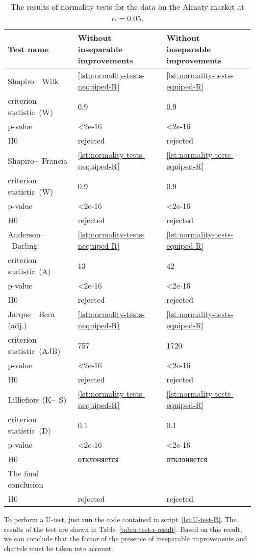 \documentclass[]{scrreprt}
\begin{document}
\begin{table}[htp]
	\caption{The results of normality tests for the data on the Almaty market at $\alpha=0.05$.}\label{tab:normality-tests-values-R}
	\centering
	\begin{tabular}{lll}
		\hline
		Test name&Without inseparable improvements&Without inseparable improvements\\
		\hline
		Shapiro--~Wilk&\ref{lst:normality-tests-nequiped-R}&\ref{lst:normality-tests-equiped-R}\\
		criterion statistic~(W)&0.9&0.9\\
		p-value&<2e-16&<2e-16\\
		H0&rejected&rejected\\
		\hline
		Shapiro--~Francia&\ref{lst:normality-tests-nequiped-R}&\ref{lst:normality-tests-equiped-R}\\
		criterion statistic~(W)&0.9&0.9\\
		p-value&<2e-16&<2e-16\\
		H0&rejected&rejected\\
		\hline
		Anderson--~Darling&\ref{lst:normality-tests-nequiped-R}&\ref{lst:normality-tests-equiped-R}\\
		criterion statistic~(A)&13&42\\
		p-value&<2e-16&<2e-16\\
		H0&rejected&rejected\\
		\hline
		Jarque--~Bera (adj.)&\ref{lst:normality-tests-nequiped-R}&\ref{lst:normality-tests-equiped-R}\\
		criterion statistic~(AJB)&757&1720\\
		p-value&<2e-16&<2e-16\\
		H0&rejected&rejected\\
		\hline
		Lilliefiors (K--~S)&\ref{lst:normality-tests-nequiped-R}&\ref{lst:normality-tests-equiped-R}\\
		criterion statistic~(D)&0.1&0.1\\
		p-value&<2e-16&<2e-16\\
		H0&отклоняется&отклоняется\\
		\hline
		The final conclusion&&\\
		H0&rejected&rejected\\
		\hline
	\end{tabular}
\end{table}
%
To perform a U-test, just run the code contained in script~\ref{lst:U-test-R}. The results of the test are shown in Table~\ref{tab:u-test-r-result}. Based on this result, we can conclude that the factor of the presence of inseparable improvements and chattels must be taken into account.
\end{document}
